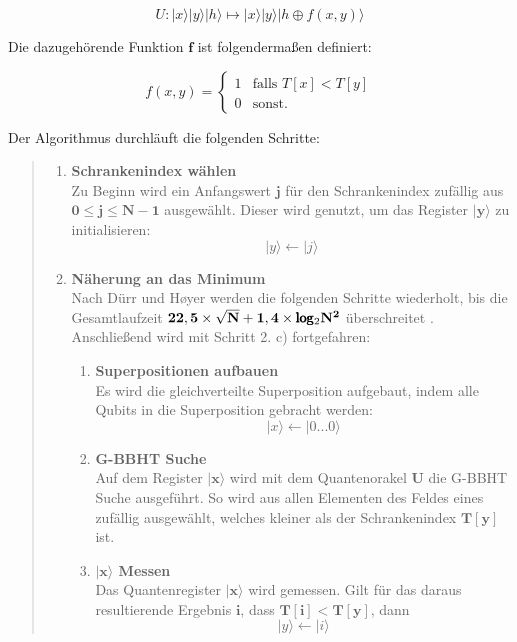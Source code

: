 \begin{equation}
	U: |x\rangle|y\rangle|h\rangle \mapsto |x\rangle|y\rangle|h \oplus f(x,y)\rangle
\end{equation}

Die dazugehörende Funktion $\mathbf{f}$ ist folgendermaßen definiert:

\begin{equation}
	f(x,y) = \begin{cases}
		1 & \text{falls } T[x] < T[y]\\    
		0 & \text{sonst.}   
	\end{cases}
\end{equation}

Der Algorithmus durchläuft die folgenden Schritte:

\begin{quote}
	\begin{enumerate}
		\item \textbf{Schrankenindex wählen}
		\\
		Zu Beginn wird ein Anfangswert $\mathbf{j}$ für den Schrankenindex zufällig aus $\mathbf{0 \leq j \leq N-1}$ ausgewählt. Dieser wird genutzt, um das Register $\mathbf{|y\rangle}$ zu initialisieren: 
		\begin{equation}
			|y\rangle \leftarrow |j\rangle
		\end{equation}
		\item \textbf{Näherung an das Minimum}
		\\
		Nach Dürr und Høyer werden die folgenden Schritte wiederholt, bis die Gesamtlaufzeit $\mathbf{22,5 \times \sqrt{N} + 1,4 \times \pmb\log\textsubscript{2}N^2}$ überschreitet \cite{Durr.1996}. 
		Anschließend wird mit Schritt 2. c) fortgefahren:
		\\
		\begin{enumerate}
			\item \textbf{Superpositionen aufbauen}
			\\
			Es wird die gleichverteilte Superposition aufgebaut, indem alle Qubits in die Superposition gebracht werden:
			\begin{equation}
				|x\rangle \leftarrow |0 ... 0 \rangle
			\end{equation}
			\item \textbf{G-BBHT Suche}
			\\
			Auf dem Register $\mathbf{|x\rangle}$ wird mit dem Quantenorakel $\mathbf{U}$ die G-BBHT Suche ausgeführt. 
			So wird aus allen Elementen des Feldes eines zufällig ausgewählt, welches kleiner als der Schrankenindex $\mathbf{T[y]}$ ist.
			\item \textbf{$\mathbf{|x\rangle}$ Messen}
			\\
			Das Quantenregister $\mathbf{|x\rangle}$ wird gemessen. 
			Gilt für das daraus resultierende Ergebnis $\mathbf{i}$, dass $\mathbf{T[i] < T[y]}$, dann 
			\begin{equation}
				|y\rangle \leftarrow |i\rangle
			\end{equation}
		\end{enumerate}
		

\end{enumerate}
\end{quote}
